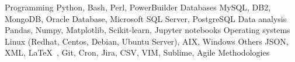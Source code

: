 %
%
%

    \begin{keywords}
        \keywordsentry
            {Programming}
            {
                Python,
                Bash,
                Perl,
                PowerBuilder
            }
        \keywordsentry
            {Databases}
            {
                MySQL,
                DB2,
                MongoDB,
                Oracle Database, 
                Microsoft SQL Server,
                PostgreSQL
            }
        \keywordsentry
            {Data analysis}
            {
                Pandas,
                Numpy,
                Matplotlib,
                Scikit-learn, 
                Jupyter notebooks
            }
        \keywordsentry
            {Operating systems}
            {
                Linux (Redhat, Centos, Debian, Ubuntu Server),
                AIX,
                Windows
            }
        \keywordsentry
            {Others}
            {
                JSON,
                XML,
                \LaTeX\ ,
                Git,
                Cron,
                Jira,
                CSV,
                VIM, 
                Sublime,
                Agile Methodologies
            }
    \end{keywords}
